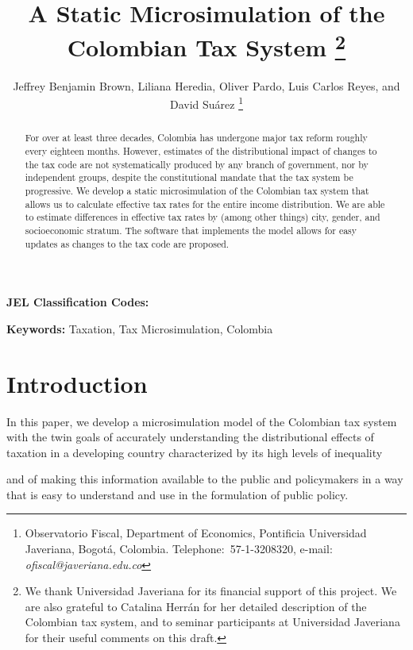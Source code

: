 \documentclass[12pt]{article}
\begin{document}
\title{A Static Microsimulation of the Colombian Tax System
  \thanks{We thank Universidad Javeriana for its financial support of this project.
    We are also grateful to Catalina Herr\'{a}n for her detailed description of the Colombian tax system,
    and to seminar participants at Universidad Javeriana for their useful comments on this draft.}}
\author{Jeffrey Benjamin Brown, Liliana Heredia, Oliver Pardo, Luis Carlos Reyes, and David Su\'{a}rez
  \thanks{Observatorio Fiscal,
    Department of Economics, Pontificia Universidad Javeriana, Bogot\'{a}, Colombia.
    Telephone:\ 57-1-3208320,
    e-mail: \textit{ofiscal@javeriana.edu.co}}}

\maketitle
\begin{abstract}
  For over at least three decades,
  Colombia has undergone major tax reform roughly every eighteen months.
  However, estimates of the distributional impact of changes to the tax code are not systematically produced by any branch of government,
  nor by independent groups,
  despite the constitutional mandate that the tax system be progressive.
  We develop a static microsimulation of the Colombian tax system
  that allows us to calculate effective tax rates
  for the entire income distribution.
  We are able to estimate differences in effective tax rates by
  (among other things) city, gender, and socioeconomic stratum.
  The software that implements the model allows for
  easy updates as changes to the tax code are proposed.
 \end{abstract}

\textbf{JEL Classification Codes:}

\textbf{Keywords:} Taxation, Tax Microsimulation, Colombia
\pagebreak%
\doublespacing

\section{Introduction}

In this paper, we develop a microsimulation model of the Colombian tax system
with the twin goals of
accurately understanding the distributional effects of taxation
in a developing country characterized by its high levels of inequality
\iffalse
    [[AN ECONOMIST:
    and informality?
    I suspect the answer is that no,
    the simulation currently has nothing to say about informality.
    While we do have a ``making pension contributions'' variable,
    we don't even report it in the final output tables,
    and the word ``formal'' only shows up twice in the simulation code,
    in the very early stages, as if we thought we might use it but never did.
    ]],
\fi
and of making this information available to the public and policymakers
in a way that is easy to understand and use in the formulation of public policy.
\end{document}
